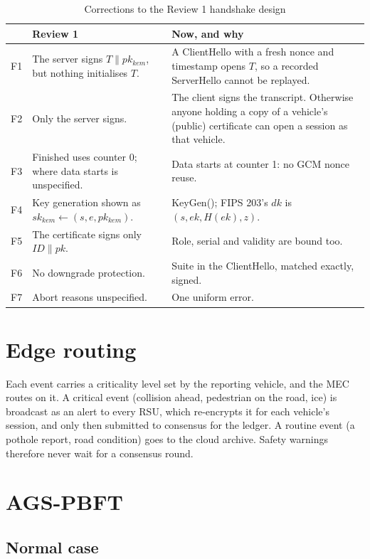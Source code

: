 \begin{table}[h]
\centering
\caption{Corrections to the Review 1 handshake design}
\label{tab:fixes}
\begin{tabular}{@{}p{0.6cm}p{6.2cm}p{6.8cm}@{}}
\toprule
& Review 1 & Now, and why \\
\midrule
F1 & The server signs $T \parallel pk_{kem}$, but nothing initialises $T$. & A ClientHello with a fresh nonce and timestamp opens $T$, so a recorded ServerHello cannot be replayed. \\
F2 & Only the server signs. & The client signs the transcript. Otherwise anyone holding a copy of a vehicle's (public) certificate can open a session as that vehicle. \\
F3 & Finished uses counter 0; where data starts is unspecified. & Data starts at counter 1: no GCM nonce reuse. \\
F4 & Key generation shown as $sk_{kem} \leftarrow (s, e, pk_{kem})$. & \textsf{KeyGen()}; FIPS 203's $dk$ is $(s, ek, H(ek), z)$. \\
F5 & The certificate signs only $ID \parallel pk$. & Role, serial and validity are bound too. \\
F6 & No downgrade protection. & Suite in the ClientHello, matched exactly, signed. \\
F7 & Abort reasons unspecified. & One uniform error. \\
\bottomrule
\end{tabular}
\end{table}

\section{Edge routing}

Each event carries a criticality level set by the reporting vehicle, and the
MEC routes on it. A critical event (collision ahead, pedestrian on the road,
ice) is broadcast as an alert to every RSU, which re-encrypts it
for each vehicle's session, and only then submitted to consensus for the
ledger. A routine event (a pothole report, road condition) goes to the cloud
archive. Safety warnings therefore never wait for a consensus round.

\section{AGS-PBFT}

\subsection{Normal case}


